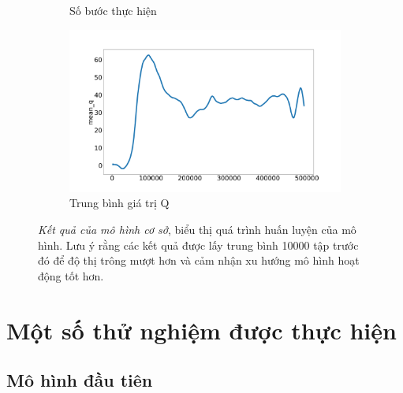 \begin{figure}[ht]
\begin{subfigure}{.5\textwidth}
      \caption{Số bước thực hiện}
      \label{fig:baseline_step}
    \end{subfigure}%
    \begin{subfigure}{.5\textwidth}
      \includegraphics[width=1.1\textwidth]{Pic/baseline/mean_q.png}  
      \caption{Trung bình giá trị Q}
      \label{fig:baseline_mean_q}
    \end{subfigure}
\caption[Kết quả của mô hình cơ sở]{\textit{Kết quả của mô hình cơ sở}, biểu thị quá trình huấn luyện của mô hình. Lưu ý rằng các kết quả được lấy trung bình 10000 tập trước đó để độ thị trông mượt hơn và cảm nhận xu hướng mô hình hoạt động tốt hơn.}
\label{fig:result_baseline}
\end{figure}
\clearpage
\section{Một số thử nghiệm được thực hiện}
\subsection{Mô hình đầu tiên}
